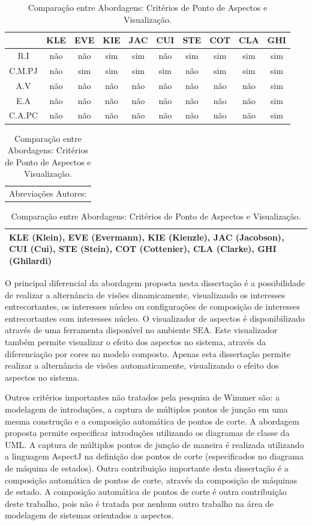 \begin{table}[h]
	\centering
	\begin{tabular}{ | c | c | c | c | c | c | c | c | c | c | }
		\hline
		 & KLE & EVE & KIE & JAC & CUI & STE & COT & CLA & GHI \\
		\hline
		 R.I & não & não & sim & sim & não & sim & sim & sim & sim \\
		\hline
		 C.M.PJ & não & sim & sim & sim & sim & não & sim & sim & sim \\
		\hline
		 A.V & não & não & não & não & não & não & não & não & sim \\
		\hline
		 E.A & não & não & não & não & não & não & não & não & sim \\
		\hline
		 C.A.PC & não & não & não & não & não & não & não & não & sim \\
		\hline
	\end{tabular}
	
	\begin{tabular}{  p{11.5cm}  }
		Abreviações Autores: \\
	\end{tabular}
	
	\begin{tabular}{ | p{11.5cm} | }
		\hline
		KLE (Klein), EVE (Evermann), KIE (Kienzle), JAC (Jacobson), CUI (Cui), STE (Stein), COT (Cottenier), CLA (Clarke), GHI (Ghilardi) \\
		\hline
	\end{tabular}
	
	\caption{Comparação entre Abordagens: Critérios de Ponto de Aspectos e Visualização.}
	\label{tab:comparison_table_aspects_visualization}
\end{table} 

O principal diferencial da abordagem proposta nesta dissertação é a possibilidade de realizar a alternância de visões dinamicamente, visualizando os
interesses entrecortantes, os interesses núcleo ou configurações de composição de interesses entrecortantes com interesses núcleo. O visualizador de
aspectos é disponibilizado através de uma ferramenta disponível no ambiente SEA. Este visualizador também permite visualizar o efeito dos aspectos no
sistema, através da diferenciação por cores no modelo composto. Apenas esta dissertação permite realizar a alternância de visões automaticamente,
visualizando o efeito dos aspectos no sistema. 

Outros critérios importantes não tratados pela pesquisa de Wimmer \cite{wimmer:2011:SUA:1978802.1978807} são: a modelagem de introduções, a captura de
múltiplos pontos de junção em uma mesma construção e a composição automática de pontos de corte. A abordagem proposta permite especificar introduções
utilizando os diagramas de classe da UML. A captura de múltiplos pontos de junção de maneira é realizada utilizando a linguagem AspectJ na definição
dos pontos de corte (especificados no diagrama de máquina de estados). Outra contribuição importante desta dissertação é a composição automática de
pontos de corte, através da composição de máquinas de estado. A composição automática de pontos de corte é outra contribuição deste
trabalho, pois não é tratada por nenhum outro trabalho na área de modelagem de sistemas orientados a aspectos.

